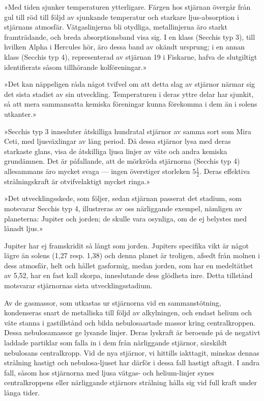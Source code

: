 \documentclass[a4paper, 12pt, oneside, swedish]{article}
\begin{document}
»Med tiden sjunker temperaturen ytterligare. Färgen hos stjärnan övergår från gul till röd till följd av sjunkande temperatur och starkare ljus-absorption i stjärnans atmosfär. Vätgaslinjerna bli otydliga, metallinjerna äro starkt framträdande, och breda absorptionsband visa sig. I en klass (Secchis typ 3), till hvilken Alpha i Hercules hör, äro dessa band av okändt ursprung; i en annan klass (Secchis typ 4), representerad av stjärnan 19 i Fiskarne, hafva de slutgiltigt identifierats såsom tillhörande kolföreningar.»

»Det kan näppeligen råda något tvifvel om att detta slag av stjärnor närmar sig det sista stadiet av sin utveckling. Temperaturen i deras yttre delar har sjunkit, så att mera sammansatta kemiska föreningar kunna förekomma i dem än i solens utkanter.»

»Secchis typ 3 innesluter åtskilliga hundratal stjärnor av samma sort som Mira Ceti, med ljusväxlingar av lång period. Då dessa stjärnor lysa med deras starkaste glans, visa de åtskilliga ljusa linjer av väte och andra kemiska grundämnen. Det är påfallande, att de mörkröda stjärnorna (Secchis typ 4) allesammans äro mycket svaga --- ingen överstiger storleken $5\frac{1}{2}$. Deras effektiva strålningskraft är otvifvelaktigt mycket ringa.»

»Det utvecklingsskede, som följer, sedan stjärnan passerat det stadium, som motsvarar Secchis typ 4, illustreras av oss närliggande exempel, nämligen av planeterna: Jupiter och jorden; de skulle vara osynliga, om de ej belystes med lånadt ljus.»

Jupiter har ej framskridit så långt som jorden. Jupiters specifika vikt är något lägre än solens (1,27 resp. 1,38) och denna planet är troligen, afsedt från molnen i dess atmosfär, helt och hållet gasformig, medan jorden, som har en medeltäthet av 5,52, har en fast kall skorpa, inneslutande dess glödheta inre. Detta tillstånd motsvarar stjärnornas sista utvecklingsstadium.

Av de gasmassor, som utkastas ur stjärnorna vid en sammanstötning, kondenseras snart de metalliska till följd av alkylningen, och endast helium och väte stanna i gastillstånd och bilda nebulosaartade massor kring centralkroppen. Dessa nebulosamassor ge lysande linjer. Deras lyskraft är beroende på de negativt laddade partiklar som falla in i dem från närliggande stjärnor, särskildt nebulosans centralkropp. Vid de nya stjärnor, vi hittills iakttagit, minskas dennas strålning hastigt och nebulosa-ljuset har därför i dessa fall hastigt aftagit. I andra fall, såsom hos stjärnorna med ljusa vätgas- och helium-linjer synes centralkroppens eller närliggande stjärnors strålning hålla sig vid full kraft under långa tider.
\end{document}
